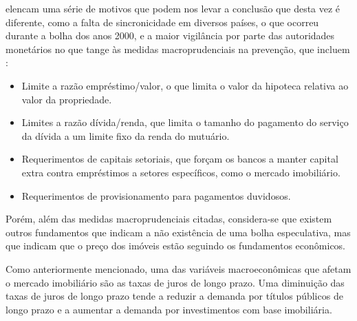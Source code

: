 \documentclass[
	12pt,				%
	oneside,			%
	a4paper,			%
	chapter=TITLE,		%
	section=TITLE,		%
	english,			%
	brazil				%
	]{abntex2}
\begin{document}
\textcite{fmitwa} elencam uma série de motivos que podem nos levar a conclusão que desta
vez é diferente, como a falta de sincronicidade em diversos países, o que
ocorreu durante a bolha dos anos 2000, e a maior vigilância por parte das
autoridades monetários no que tange às medidas macroprudenciais na prevenção,
que incluem \autocite{fmiem}:
\begin{itemize}
\tightlist
\item
  Limite a razão empréstimo/valor, o que limita o valor da hipoteca relativa
  ao valor da propriedade.
\item
  Limites a razão dívida/renda, que limita o tamanho do pagamento do serviço da
  dívida a um limite fixo da renda do mutuário.
\item
  Requerimentos de capitais setoriais, que forçam os bancos a manter capital
  extra contra empréstimos a setores específicos, como o mercado imobiliário.
\item
  Requerimentos de provisionamento para pagamentos duvidosos.
\end{itemize}
Porém, além das medidas macroprudenciais citadas, considera-se que existem
outros fundamentos que indicam a não existência de uma bolha especulativa, mas
que indicam que o preço dos imóveis estão seguindo os fundamentos econômicos.

Como anteriormente mencionado, uma das variáveis macroeconômicas que afetam o
mercado imobiliário são as taxas de juros de longo prazo. Uma diminuição das
taxas de juros de longo prazo tende a reduzir a demanda por títulos públicos de
longo prazo e a aumentar a demanda por investimentos com base imobiliária.
\end{document}
